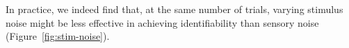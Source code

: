 \documentclass[si.tex]{subfiles}
\begin{document}
In practice, we indeed find that, at the same number of trials, varying stimulus noise might be less effective in achieving identifiability than sensory noise (Figure~\ref{fig:stim-noise}).

\end{document}
